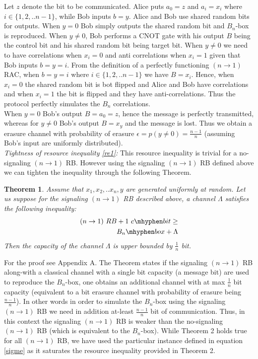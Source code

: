 \documentclass[%
 reprint,
 amsmath,amssymb,
 aps,
]{revtex4-1}
\newtheorem{mydef1}{Theorem}
\begin{document}
Let $z$ denote the bit to be communicated. Alice puts $a_0=z$ and  $a_i=x_i$ where $i\in \{1,2,..n-1\}$, while Bob inputs $b=y$. Alice and Bob use shared random bits for outputs. When $y=0$ Bob simply outputs the shared random bit and $B_n$-box is reproduced. When $y\neq 0$, Bob performs a CNOT gate with his output $B$ being the control bit and his shared random bit being target bit. When $y\neq 0$ we need to have correlations when $x_i=0$ and anti correlations when $x_i=1$ given that Bob inputs $b=y=i$. From the definition of a perfectly functioning $(n\rightarrow 1)$ RAC, when $b=y=i$ where $i\in \{1,2,..n-1\}$ we have $B=x_i$. Hence, when $x_i=0$ the shared random bit is bot flipped and Alice and Bob have correlations and when $x_i=1$ the bit is flipped and they have anti-correlations. Thus the protocol perfectly simulates the $B_n$ correlations.\\
When $y=0$ Bob's output $B=a_0=z$, hence the message is perfectly transmitted, whereas for $y\neq 0$ Bob's output $B=x_y$ and the message is lost. Thus we obtain a erasure channel with probability of erasure  $\epsilon=p(y\neq 0)=\frac{n-1}{n}$ (assuming Bob's input are uniformly distributed). \\
\textit{Tightness of resource inequality \ref{re1}:} This resource inequality is trivial for a no-signaling $(n\rightarrow 1)$ RB. However using the signaling $(n\rightarrow 1)$ RB defined above we can tighten the inequality through the following Theorem.
\begin{mydef1} \label{thm2}
Assume that $x_1,x_2,..x_n,y$ are generated uniformly at random. Let us suppose for the signaling $(n\rightarrow 1)$ RB described above, a channel $\Lambda$ satisfies the following inequality:
\begin{eqnarray} \label{REsh}
(n\rightarrow1)\ RB + 1\  c\mhyphen bit \geq \nonumber \\ B_n\mhyphen box + \Lambda
\end{eqnarray}
Then the capacity of the channel $\Lambda$ is upper bounded by $\frac{1}{n}$ bit.
\end{mydef1} \label{thm2}
For the proof see Appendix A.  The Theorem states if the signaling $(n \rightarrow 1)$ RB along-with a classical channel with a single bit capacity (a message bit) are used to reproduce the $B_n$-box, one obtains an additional channel with at max $\frac{1}{n}$ bit capacity (equivalent to a bit erasure channel with probability of erasure being $\frac{n-1}{n}$). In other words in order to simulate the $B_n$-box using the signaling $(n\rightarrow 1)$ RB we need in addition at-least $\frac{n-1}{n}$ bit of communication. Thus, in this context the signaling $(n\rightarrow 1)$ RB is  weaker than the no-signaling $(n\rightarrow 1)$ RB (which is equivalent to the $B_n$-box). While Theorem 2 holds true for all $(n\rightarrow1)$ RB,
we have used the particular instance defined in equation \ref{sigme} as it saturates the resource inequality provided in Theorem 2.
\end{document}
